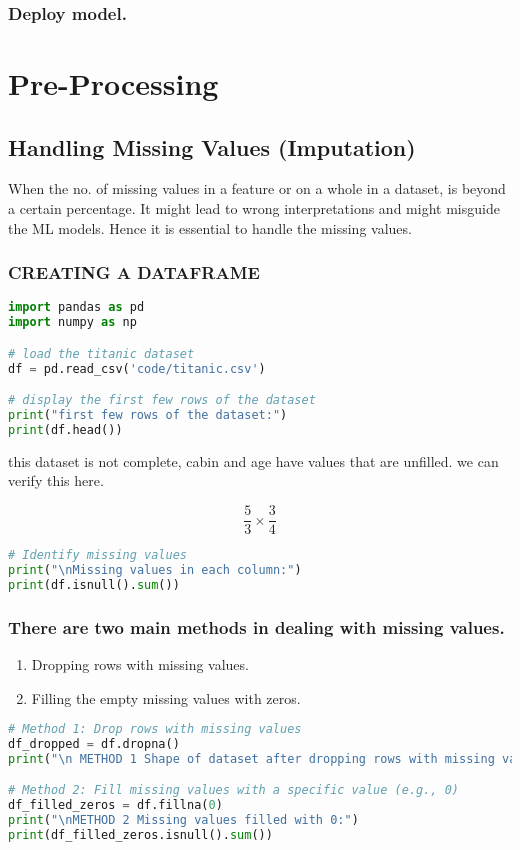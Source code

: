 \documentclass[11pt]{article}
\begin{document}
\subsubsection{Deploy model.}
\label{sec:orgae4dd64}
\section{Pre-Processing}
\label{sec:org8040a2e}
\subsection{Handling Missing Values (Imputation)}
\label{sec:org369770d}
When the no. of missing values in a feature or on a whole in a dataset, is beyond a certain percentage. It might lead to wrong interpretations and might misguide the ML models.
Hence it is essential to handle the missing values.
\subsubsection{CREATING A DATAFRAME}
\label{sec:org51cf9a6}
\begin{lstlisting}[language=Python,numbers=none]
import pandas as pd
import numpy as np

# load the titanic dataset
df = pd.read_csv('code/titanic.csv')

# display the first few rows of the dataset
print("first few rows of the dataset:")
print(df.head())
\end{lstlisting}

this dataset is not complete, cabin and age have values that are unfilled. we can verify this here.

$$\frac{5}{3} \times \frac{3}{4}$$

\begin{lstlisting}[language=Python,numbers=none]
# Identify missing values
print("\nMissing values in each column:")
print(df.isnull().sum())

\end{lstlisting}
\subsubsection{There are two main methods in dealing with missing values.}
\label{sec:orge2ee266}
\begin{enumerate}
\item Dropping rows with missing values.
\item Filling the empty missing values with zeros.
\end{enumerate}
\begin{lstlisting}[language=Python,numbers=none]
# Method 1: Drop rows with missing values
df_dropped = df.dropna()
print("\n METHOD 1 Shape of dataset after dropping rows with missing values:", df_dropped.shape)

# Method 2: Fill missing values with a specific value (e.g., 0)
df_filled_zeros = df.fillna(0)
print("\nMETHOD 2 Missing values filled with 0:")
print(df_filled_zeros.isnull().sum())

\end{lstlisting}
\end{document}
